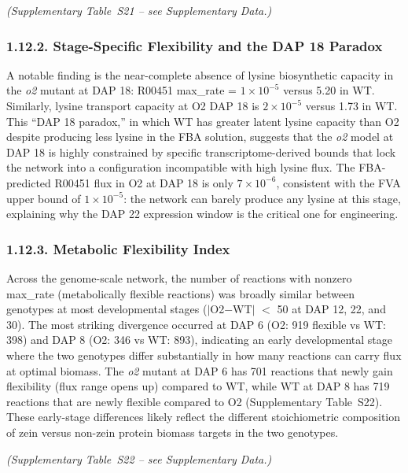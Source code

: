 \documentclass[12pt,a4paper]{article}
\begin{document}
\noindent\textit{(Supplementary Table~S21 -- see Supplementary Data.)}


\subsubsection{1.12.2. Stage-Specific Flexibility and the DAP 18 Paradox}

A notable finding is the near-complete absence of lysine biosynthetic capacity in the \textit{o2} mutant at DAP 18: R00451 max\_rate = $1 \times 10^{-5}$ versus 5.20 in WT. Similarly, lysine transport capacity at O2 DAP 18 is $2 \times 10^{-5}$ versus 1.73 in WT. This ``DAP 18 paradox,'' in which WT has greater latent lysine capacity than O2 despite producing less lysine in the FBA solution, suggests that the \textit{o2} model at DAP 18 is highly constrained by specific transcriptome-derived bounds that lock the network into a configuration incompatible with high lysine flux. The FBA-predicted R00451 flux in O2 at DAP 18 is only $7 \times 10^{-6}$, consistent with the FVA upper bound of $1 \times 10^{-5}$: the network can barely produce any lysine at this stage, explaining why the DAP 22 expression window is the critical one for engineering.

\subsubsection{1.12.3. Metabolic Flexibility Index}

Across the genome-scale network, the number of reactions with nonzero max\_rate (metabolically flexible reactions) was broadly similar between genotypes at most developmental stages ($|$O2$-$WT$|$ $<$ 50 at DAP 12, 22, and 30). The most striking divergence occurred at DAP 6 (O2: 919 flexible vs WT: 398) and DAP 8 (O2: 346 vs WT: 893), indicating an early developmental stage where the two genotypes differ substantially in how many reactions can carry flux at optimal biomass. The \textit{o2} mutant at DAP 6 has 701 reactions that newly gain flexibility (flux range opens up) compared to WT, while WT at DAP 8 has 719 reactions that are newly flexible compared to O2 (Supplementary Table~S22). These early-stage differences likely reflect the different stoichiometric composition of zein versus non-zein protein biomass targets in the two genotypes.


\noindent\textit{(Supplementary Table~S22 -- see Supplementary Data.)}
\end{document}
